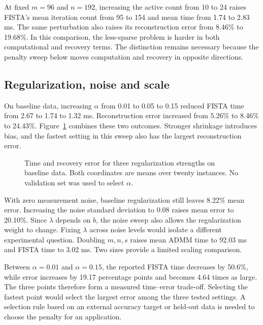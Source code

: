 \documentclass{article}
\begin{document}
At fixed $m=96$ and $n=192$, increasing the active count from 10 to 24 raises FISTA's mean iteration count from 95 to 154 and mean time from 1.74 to 2.83 ms. The same perturbation also raises its reconstruction error from 8.46\% to 19.68\%. In this comparison, the less-sparse problem is harder in both computational and recovery terms. The distinction remains necessary because the penalty sweep below moves computation and recovery in opposite directions.

\subsection{Regularization, noise and scale}
On baseline data, increasing $\alpha$ from 0.01 to 0.05 to 0.15 reduced FISTA time from 2.67 to 1.74 to 1.32 ms. Reconstruction error increased from 5.26\% to 8.46\% to 24.43\%. Figure~\ref{fig:tradeoff} combines these two outcomes. Stronger shrinkage introduces bias, and the fastest setting in this sweep also has the largest reconstruction error.
\begin{figure}[htbp]\centering
{}
\caption{Time and recovery error for three regularization strengths on baseline data. Both coordinates are means over twenty instances. No validation set was used to select $\alpha$.}\label{fig:tradeoff}
\end{figure}

With zero measurement noise, baseline regularization still leaves 8.22\% mean error. Increasing the noise standard deviation to 0.08 raises mean error to 20.10\%. Since $\lambda$ depends on $b$, the noise sweep also allows the regularization weight to change. Fixing $\lambda$ across noise levels would isolate a different experimental question. Doubling $m,n,s$ raises mean ADMM time to 92.03 ms and FISTA time to 3.02 ms. Two sizes provide a limited scaling comparison.


Between $\alpha=0.01$ and $\alpha=0.15$, the reported FISTA time decreases by 50.6\%, while error increases by 19.17 percentage points and becomes 4.64 times as large. The three points therefore form a measured time--error trade-off. Selecting the fastest point would select the largest error among the three tested settings. A selection rule based on an external accuracy target or held-out data is needed to choose the penalty for an application.
\end{document}
